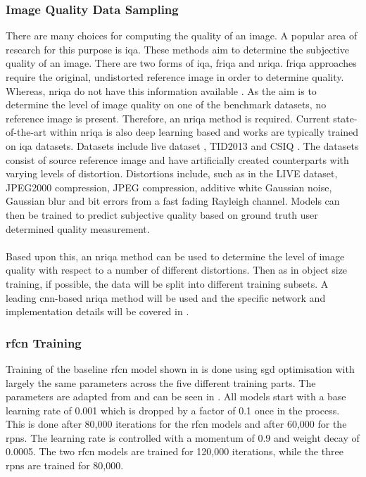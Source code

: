 \documentclass[a4paper,twoside]{article}
\begin{document}
\subsubsection{Image Quality Data Sampling}
There are many choices for computing the quality of an image. A popular area of research for this purpose is \gls{iqa}. These methods aim to determine the subjective quality of an image. There are two forms of \gls{iqa}, \gls{friqa} and \gls{nriqa}. \gls{friqa} approaches require the original, undistorted reference image in order to determine quality. Whereas, \gls{nriqa} do not have this information available \cite{deepiqa}. As the aim is to determine the level of image quality on one of the benchmark datasets, no reference image is present. Therefore, an \gls{nriqa} method is required. Current state-of-the-art within \gls{nriqa} is also deep learning based and works are typically trained on \gls{iqa} datasets. Datasets include \gls{live} dataset \cite{livepaper} \cite{liveweb}, TID2013 \cite{tid2013} and CSIQ \cite{csiq}. The datasets consist of source reference image and have artificially created counterparts with varying levels of distortion. Distortions include, such as in the LIVE dataset, JPEG2000 compression, JPEG compression, additive white Gaussian noise, Gaussian blur and bit errors from a fast fading Rayleigh channel. Models can then be trained to predict subjective quality based on ground truth user determined quality measurement.
\\\\
Based upon this, an \gls{nriqa} method can be used to determine the level of image quality with respect to a number of different distortions. Then as in object size training, if possible, the data will be split into different training subsets. A leading \gls{cnn}-based \gls{nriqa} method will be used and the specific network and implementation details will be covered in .

\subsubsection{\gls{rfcn} Training}
Training of the baseline \gls{rfcn} model shown in  is done using \gls{sgd} optimisation with largely the same parameters across the five different training parts. The parameters are adapted from \cite{rfcn} and can be seen in . All models start with a base learning rate of 0.001 which is dropped by a factor of 0.1 once in the process. This is done after 80,000 iterations for the \gls{rfcn} models and after 60,000 for the \glspl{rpn}. The learning rate is controlled with a momentum of 0.9 and weight decay of 0.0005. The two \gls{rfcn} models are trained for 120,000 iterations, while the three \glspl{rpn} are trained for 80,000.
\end{document}
